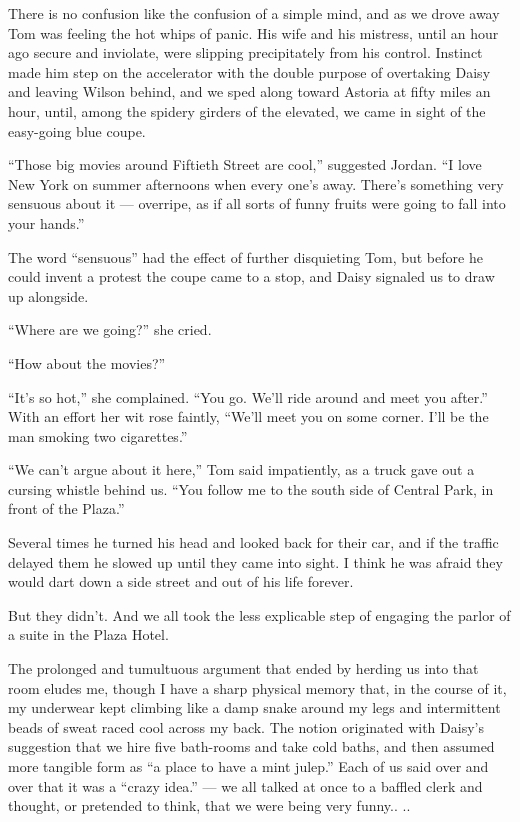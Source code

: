 \documentclass{znotebook}
\begin{document}
There is no confusion like the confusion of a simple mind, and as we drove away Tom was feeling the hot whips of panic. His wife and his mistress, until an hour ago secure and inviolate, were slipping precipitately from his control. Instinct made him step on the accelerator with the double purpose of overtaking Daisy and leaving Wilson behind, and we sped along toward Astoria at fifty miles an hour, until, among the spidery girders of the elevated, we came in sight of the easy-going blue coupe.

``Those big movies around Fiftieth Street are cool,'' suggested Jordan. ``I love New York on summer afternoons when every one's away. There's something very sensuous about it ---{} overripe, as if all sorts of funny fruits were going to fall into your hands.''

The word ``sensuous'' had the effect of further disquieting Tom, but before he could invent a protest the coupe came to a stop, and Daisy signaled us to draw up alongside.

``Where are we going?'' she cried.

``How about the movies?''

``It's so hot,'' she complained. ``You go. We'll ride around and meet you after.'' With an effort her wit rose faintly, ``We'll meet you on some corner. I'll be the man smoking two cigarettes.''

``We can't argue about it here,'' Tom said impatiently, as a truck gave out a cursing whistle behind us. ``You follow me to the south side of Central Park, in front of the Plaza.''

Several times he turned his head and looked back for their car, and if the traffic delayed them he slowed up until they came into sight. I think he was afraid they would dart down a side street and out of his life forever.

But they didn't. And we all took the less explicable step of engaging the parlor of a suite in the Plaza Hotel.

The prolonged and tumultuous argument that ended by herding us into that room eludes me, though I have a sharp physical memory that, in the course of it, my underwear kept climbing like a damp snake around my legs and intermittent beads of sweat raced cool across my back. The notion originated with Daisy's suggestion that we hire five bath-rooms and take cold baths, and then assumed more tangible form as ``a place to have a mint julep.'' Each of us said over and over that it was a ``crazy idea.'' ---{} we all talked at once to a baffled clerk and thought, or pretended to think, that we were being very funny.. ..
\end{document}
